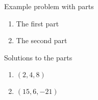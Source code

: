 \begin{exercises}
	\begin{problist}
		\prob[\beezer]  Example problem with parts
		\begin{enumerate}
			\item   The first part
			\item   The second part
		\end{enumerate}
		\begin{solution}
		Solutions to the parts
			\begin{enumerate}
				\item   $(2,4,8)$
				\item   $(15,6,-21)$
			\end{enumerate}
		\end{solution}

	\end{problist}
\end{exercises}
